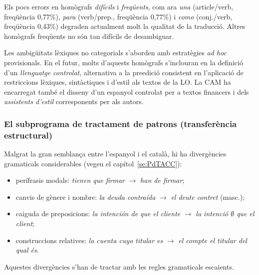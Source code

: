 Els pocs errors en homògrafs \emph{difícils} i \emph{freqüents}, com
ara \emph{una} (article/verb, freqüència 0,77\%), \emph{para}
(verb/prep., freqüència 0,77\%) i \emph{como} (conj./verb, freqüència
0,43\%) degraden actualment molt la qualitat de la traducció. Altres
homògrafs freqüents no són tan difícils de desambiguar.

Les ambigüitats lèxiques no categorials s'aborden amb estratègies {\em
  ad hoc} provisionals. En el futur, molts d'aquests homògrafs
s'inclouran en la definició d'un \emph{llenguatge controlat},
alternativa a la preedició consistent en l'aplicació de restriccions
lèxiques, sintàctiques i d'estil als textos de la LO. La CAM ha
encarregat també el disseny d'un espanyol controlat per a textos
financers i dels \emph{assistents d'estil} corresponents per als
autors.


\subsubsection{El subprograma de tractament de patrons (transferència
  estructural)} 
Malgrat la gran semblança entre l'espanyol i el català, hi ha
divergències gramaticals considerables (vegeu el capítol~\ref{se:PdTACC}):
\begin{itemize}
\item perífrasis modals: \emph{tienen que firmar}
$\rightarrow$ \emph{han de firmar}; 
\item canvis de gènere i nombre: \emph{la deuda
  contraída} $\rightarrow$ \emph{el deute contret} (masc.);
\item caiguda de preposicions: \emph{la intención de que el cliente} $\rightarrow$ \emph{la
intenció $\emptyset$ que el client}; 
\item construccions relatives: \emph{la cuenta cuyo titular es} $\rightarrow$ \emph{el compte el
    titular del qual és}.
\end{itemize}
Aquestes divergències s'han de tractar amb les regles gramaticals
escaients.  

